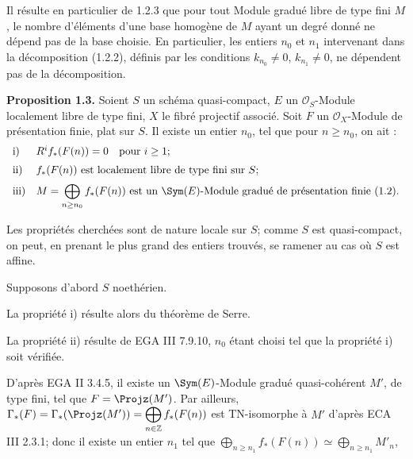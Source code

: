 Il
résulte en particulier de 1.2.3 que pour tout Module gradué libre de type fini \(M\), le nombre d'éléments d'une base homogène de \(M\) ayant un degré donné ne dépend pas de la base choisie. En particulier, les entiers \(n_0\) et \(n_1\) intervenant dans la décomposition (1.2.2), définis par les conditions \(k_{n_0}\neq0\), \(k_{n_1}\neq0\), ne dépendent pas de la décomposition.

\textbf{Proposition 1.3.} Soient \(S\) un schéma quasi-compact, \(E\) un \(\mathcal O_S\)-Module localement libre de type fini, \(X\) le fibré projectif associé. Soit \(F\) un \(\mathcal O_X\)-Module de présentation finie, plat sur \(S\). Il existe un entier \(n_0\), tel que pour \(n\geq n_0\), on ait :
\[
\begin{array}{ll}
\text{i)}& R^i f_*(F(n))=0\quad\text{pour }i\geq 1;\\[2mm]
\text{ii)}& f_*(F(n))\text{ est localement libre de type fini sur }S;\\[2mm]
\text{iii)}& M=\displaystyle\bigoplus_{n\geq n_0} f_*(F(n))\text{ est un }\Sym(E)\text{-Module gradué de présentation finie (1.2).}
\end{array}
\]

Les propriétés cherchées sont de nature locale sur \(S\); comme \(S\) est quasi-compact, on peut, en prenant le plus grand des entiers trouvés, se ramener au cas où \(S\) est affine.

Supposons d'abord \(S\) noethérien.

La propriété i) résulte alors du théorème de Serre.

La propriété ii) résulte de EGA III 7.9.10, \(n_0\) étant choisi tel que la propriété i) soit vérifiée.

D'après EGA II 3.4.5, il existe un \(\Sym(E)\)-Module gradué quasi-cohérent \(M'\), de type fini, tel que \(F=\Projz(M')\). Par ailleurs, \(\Gamma_*(F)=\Gamma_*(\Projz(M'))=\displaystyle\bigoplus_{n\in\mathbb Z} f_*(F(n))\) est TN-isomorphe à \(M'\) d'après ECA III 2.3.1; donc il existe un entier \(n_1\) tel que \(\displaystyle\bigoplus_{n\geq n_1} f_*(F(n))\simeq \bigoplus_{n\geq n_1} M'_n\),
